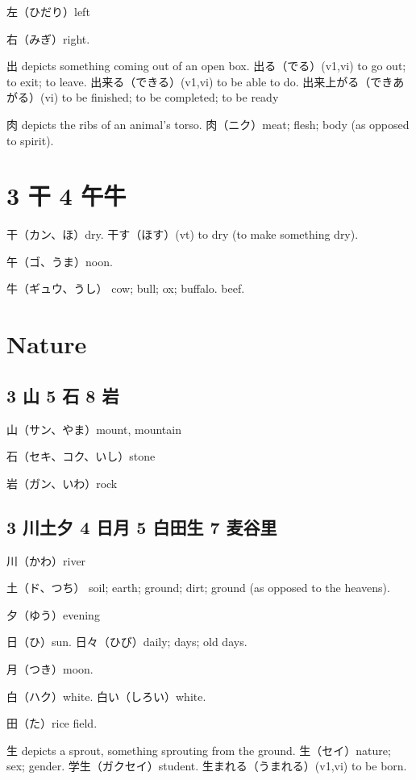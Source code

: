 左（ひだり）left

右（みぎ）right.

出 depicts something coming out of an open box.
出る（でる）(v1,vi) to go out; to exit; to leave.
出来る（できる）(v1,vi) to be able to do.
出来上がる（できあがる）(vi) to be finished; to be completed; to be ready

肉 depicts the ribs of an animal's torso.
肉（ニク）meat; flesh; body (as opposed to spirit).

\section{3 干 4 午牛}

干（カン、ほ）dry.
干す（ほす）(vt) to dry (to make something dry).

午（ゴ、うま）noon.

牛（ギュウ、うし）
cow; bull; ox; buffalo.
beef.

\section{Nature}

\subsection{3 山 5 石 8 岩}

山（サン、やま）mount, mountain

石（セキ、コク、いし）stone

岩（ガン、いわ）rock

\subsection{3 川土夕 4 日月 5 白田生 7 麦谷里}

川（かわ）river

土（ド、つち）
soil; earth; ground; dirt; ground (as opposed to the heavens).

夕（ゆう）evening

日（ひ）sun.
日々（ひび）daily; days; old days.

月（つき）moon.

白（ハク）white.
白い（しろい）white.

田（た）rice field.

生 depicts a sprout, something sprouting from the ground.
生（セイ）nature; sex; gender.
学生（ガクセイ）student.
生まれる（うまれる）(v1,vi) to be born.

